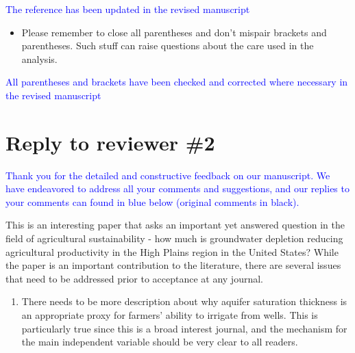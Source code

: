 \documentclass[
]{article}
\providecommand{\tightlist}{%
  \setlength{\itemsep}{0pt}\setlength{\parskip}{0pt}}
\begin{document}
\textcolor{blue}{The reference has been updated in the revised manuscript}

\begin{itemize}
\tightlist
\item
  Please remember to close all parentheses and don't mispair brackets
  and parentheses. Such stuff can raise questions about the care used in
  the analysis.
\end{itemize}

\textcolor{blue}{All parentheses and brackets have been checked and corrected where necessary in the revised manuscript}

\section{Reply to reviewer \#2}

\textcolor{blue}{Thank you for the detailed and constructive feedback on our manuscript. We have endeavored to address all your comments and suggestions, and our replies to your comments can found in blue below (original comments in black).}

This is an interesting paper that asks an important yet answered
question in the field of agricultural sustainability - how much is
groundwater depletion reducing agricultural productivity in the High
Plains region in the United States? While the paper is an important
contribution to the literature, there are several issues that need to be
addressed prior to acceptance at any journal.

\begin{enumerate}
\def\labelenumi{\arabic{enumi}.}
\tightlist
\item
  There needs to be more description about why aquifer saturation
  thickness is an appropriate proxy for farmers' ability to irrigate
  from wells. This is particularly true since this is a broad interest
  journal, and the mechanism for the main independent variable should be
  very clear to all readers.
\end{enumerate}
\end{document}
